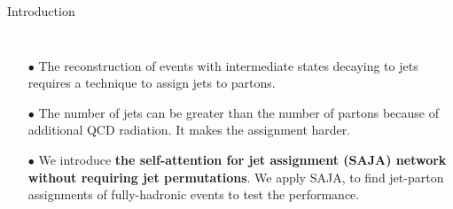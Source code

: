 \makeatletter
  \graphicspath{ {@path} }
\makeatother

\begin{frame}[fragile]{Introduction}
\begin{columns}
    \begin{itemize}
      \item[$\bullet$] The reconstruction of events with intermediate states 
                       decaying to jets requires a technique to assign jets to partons.
      \item[$\bullet$] The number of jets can be greater than the number of 
                       partons because of additional QCD radiation. It makes the assignment harder.
      \item[$\bullet$] We introduce {\bfseries the self-attention for jet
                       assignment (SAJA) network without requiring jet permutations}.
                       We apply SAJA, to find jet-parton assignments of
                       fully-hadronic \ttbar events to test the performance.
    \end{itemize}
\end{columns}
\end{frame}

